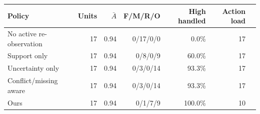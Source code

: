 \begin{tabular}{lrrrrrr}
\toprule
Policy & Units & $\bar{A}$ & F/M/R/O & High handled & Action load \\
\midrule
No active re-observation & 17 & 0.94 & 0/17/0/0 & 0.0\% & 17 \\
Support only & 17 & 0.94 & 0/8/0/9 & 60.0\% & 17 \\
Uncertainty only & 17 & 0.94 & 0/3/0/14 & 93.3\% & 17 \\
Conflict/missing aware & 17 & 0.94 & 0/3/0/14 & 93.3\% & 17 \\
Ours & 17 & 0.94 & 0/1/7/9 & 100.0\% & 10 \\
\bottomrule
\end{tabular}
